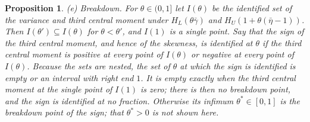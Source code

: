 \documentclass[11pt]{article}
\newtheorem{proposition}{Proposition}
\theoremstyle{remark}
\begin{document}
\begin{proposition}
(e) \emph{Breakdown.} For $\theta\in(0,1]$ let $I(\theta)$ be the identified set of the variance and third central moment under $H_L(\theta\bar\gamma)$ and $H_U(1+\theta(\bar\eta-1))$. Then $I(\theta')\subseteq I(\theta)$ for $\theta<\theta'$, and $I(1)$ is a single point. Say that the sign of the third central moment, and hence of the skewness, is identified at $\theta$ if the third central moment is positive at every point of $I(\theta)$ or negative at every point of $I(\theta)$. Because the sets are nested, the set of $\theta$ at which the sign is identified is empty or an interval with right end $1$. It is empty exactly when the third central moment at the single point of $I(1)$ is zero; there is then no breakdown point, and the sign is identified at no fraction. Otherwise its infimum $\theta^*\in[0,1]$ is the breakdown point of the sign; that $\theta^*>0$ is not shown here.
\end{proposition}
\end{document}
